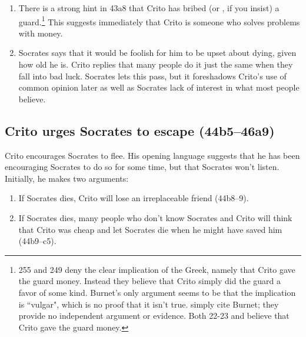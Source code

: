 \documentclass[11pt]{article}
\begin{document}
\begin{enumerate}

    \item There is a strong hint in 43a8 that Crito has bribed (or
        , if you insist) a guard.\footnote{\citet{burnet1924}
        255 and \citet{brickhouse2004} 249 deny the clear implication
        of the Greek, namely that Crito gave the guard money.  Instead
        they believe that Crito simply did the guard a favor of some
        kind.  Burnet's only argument seems to be that the implication
        is ``vulgar", which is no proof that it isn't true.
        \citet{brickhouse2004} simply cite Burnet; they provide no
        independent argument or evidence.  Both \citet{adam1988} 22-23 and
        \citet{rose1983} believe that Crito gave the guard money.}  This
        suggests immediately that Crito is someone who solves problems with
        money.

    \item Socrates says that it would be foolish for him to be upset about
        dying, given how old he is.  Crito replies that many people do it
        just the same when they fall into bad luck.  Socrates lets this
        pass, but it foreshadows Crito's use of common opinion later as
        well as Socrates lack of interest in what most people believe.

\end{enumerate}


\subsection{Crito urges Socrates to escape (44b5--46a9)}

Crito encourages Socrates to flee.  His opening language suggests that he
has been encouraging Socrates to do so for some time, but that Socrates
won't listen.  Initially, he makes two arguments:

\begin{enumerate}

    \item If Socrates dies, Crito will lose an irreplaceable friend
        (44b8--9).

    \item If Socrates dies, many people who don't know Socrates and Crito
        will think that Crito was cheap and let Socrates die when he might
        have saved him (44b9--c5).

\end{enumerate}
\end{document}
